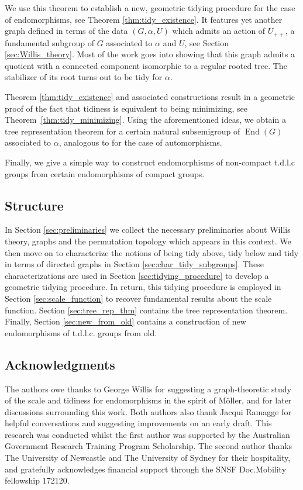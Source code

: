 \documentclass{article}
\DeclareMathOperator\End{End}
\theoremstyle{definition}
\begin{document}
We use this theorem to establish a new, geometric tidying procedure for the case of endomorphisms, see Theorem \ref{thm:tidy_existence}. It features yet another graph defined in terms of the data $(G,\alpha,U)$ which admits an action of $U_{++}$, a fundamental subgroup of $G$ associated to $\alpha$ and $U$, see Section \ref{sec:Willis_theory}.
Most of the work goes into showing that this graph admits a quotient with a connected component isomorphic to a regular rooted tree. The stabilizer of its root turns out to be tidy for $\alpha$.

Theorem \ref{thm:tidy_existence} and associated constructions result in a geometric proof of the fact \cite[Theorem 2]{Wil15} that tidiness is equivalent to being minimizing, see Theorem~\ref{thm:tidy_minimizing}. Using the aforementioned ideas, we obtain a tree representation theorem for a certain natural subsemigroup of $\End(G)$ associated to $\alpha$, analogous to \cite[Theorem 4.1]{BW04} for the case of automorphisms.

Finally, we give a simple way to construct endomorphisms of non-compact t.d.l.c groups from certain endomorphisms of compact groups. 

\subsection{Structure}
In Section \ref{sec:preliminaries} we collect the necessary preliminaries about Willis theory, graphs and the permutation topology which appears in this context. We then move on to characterize the notions of being tidy above, tidy below and tidy in terms of directed graphs in Section \ref{sec:char_tidy_subgroups}. These characterizations are used in Section \ref{sec:tidying_procedure} to develop a geometric tidying procedure. In return, this tidying procedure is employed in Section \ref{sec:scale_function} to recover fundamental results about the scale function. Section \ref{sec:tree_rep_thm} contains the tree representation theorem. Finally, Section \ref{sec:new_from_old} contains a construction of new endomorphisms of t.d.l.c. groups from old.

\subsection{Acknowledgments}
The authors owe thanks to George Willis for suggesting a graph-theoretic study of the scale and tidiness for endomorphisms in the spirit of M{\"o}ller, and for later discussions surrounding this work. Both authors also thank Jacqui Ramagge for helpful conversations and suggesting improvements on an early draft. This research was conducted whilst the first author was supported by the Australian Government Research Training Program Scholarship. The second author thanks The University of Newcastle and The University of Sydney for their hospitality, and gratefully acknowledges financial support through the SNSF Doc.Mobility fellowship 172120.
\end{document}
